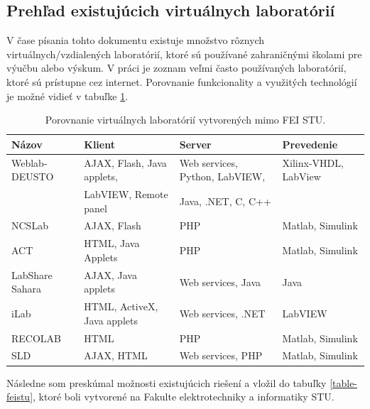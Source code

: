 \subsection{Prehľad existujúcich virtuálnych laboratórií}
V čase písania tohto dokumentu existuje množstvo rôznych virtuálnych/vzdialených laboratórií, ktoré sú používané zahraničnými školami pre výučbu alebo výskum. V práci \cite{vlabtablecomparison} je zoznam veľmi často používaných laboratórií, ktoré sú prístupne cez internet. Porovnanie funkcionality a využitých technológií je možné vidieť v tabuľke \ref{table-vlab-comparison}.

\begin{table}[H]
\scriptsize
\begin{tabular}{l l l l}
\hline\hline
\textbf{Názov} & \textbf{Klient} & \textbf{Server} & \textbf{Prevedenie}\\ \hline
Weblab-DEUSTO & AJAX, Flash, Java applets, & Web services, Python, LabVIEW, & Xilinx-VHDL, LabView\\
&LabVIEW, Remote panel & Java, .NET, C, C++ &\\ \hline
NCSLab & AJAX, Flash & PHP & Matlab, Simulink\\ \hline
ACT & HTML, Java Applets & PHP & Matlab, Simulink\\ \hline
LabShare Sahara & AJAX, Java applets & Web services, Java & Java\\ \hline
iLab & HTML, ActiveX, Java applets & Web services, .NET & LabVIEW\\ \hline
RECOLAB & HTML & PHP & Matlab, Simulink\\ \hline
SLD & AJAX, HTML & Web services, PHP & Matlab, Simulink\\ \hline\hline
\end{tabular}
\caption{Porovnanie virtuálnych laboratórií vytvorených mimo FEI STU.}
\label{table-vlab-comparison}
\end{table}

Následne som preskúmal možnosti existujúcich riešení a vložil do tabuľky \ref{table-feistu}, ktoré boli vytvorené na Fakulte elektrotechniky a informatiky STU.\cite{table-vlab-farkas}\cite{table-vlab-borka}\cite{table-vlab-kundrat}\cite{table-vlab-cerveny}\cite{table-vlab-varga}

